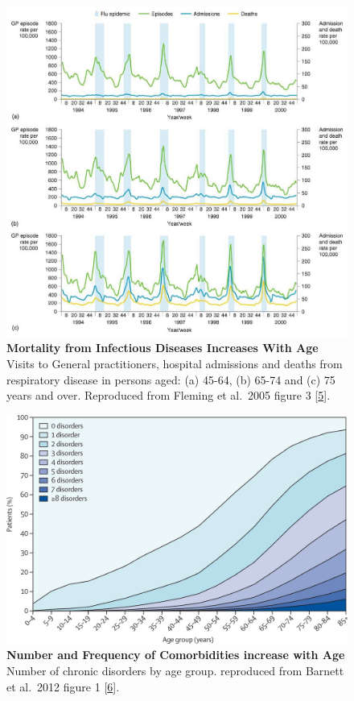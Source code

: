 \documentclass[
]{book}
\begin{document}
\begin{figure}

{\centering \includegraphics[width=0.9\linewidth]{figs/Fleming2005_fig3} 

}

\caption{\textbf{Mortality from Infectious Diseases Increases With Age} Visits to General practitioners, hospital admissions and deaths from respiratory disease in persons aged: (a) 45-64, (b) 65-74 and (c) 75 years and over. Reproduced from Fleming et al.~2005 figure 3 {[}\protect\hyperlink{ref-Fleming2005}{5}{]}.}\label{fig:Fleming2005-fig3}
\end{figure}



\begin{figure}

{\centering \includegraphics[width=0.8\linewidth]{figs/Barnett2012_fig1} 

}

\caption{\textbf{Number and Frequency of Comorbidities increase with Age} Number of chronic disorders by age group. reproduced from Barnett et al.~2012 figure 1 {[}\protect\hyperlink{ref-Barnett2012}{6}{]}.}\label{fig:Barnett2012-fig1}
\end{figure}
\end{document}
